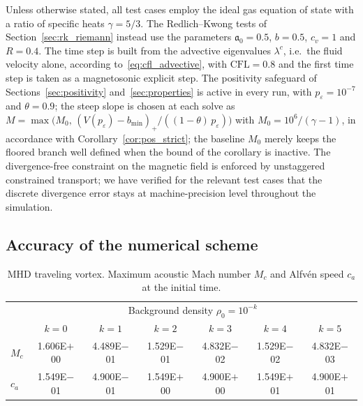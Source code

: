 \documentclass[a4paper,fleqn]{cas-sc}
\theoremstyle{definition}
\theoremstyle{remark}
\begin{document}
Unless otherwise stated, all test cases employ the ideal gas equation of state
with a ratio of specific heats $\gamma = 5/3$. The Redlich--Kwong tests of
Section~\ref{sec:rk_riemann} instead use the parameters $\mathfrak{a}_0 = 0.5$,
$b = 0.5$, $c_v = 1$ and $R = 0.4$. The time step
is built from the advective eigenvalues $\lambda^{c}$, i.e.\ the fluid velocity
alone, according to~\eqref{eq:cfl_advective}, with
$\mathrm{CFL} = 0.8$ and the first time step is taken as a magnetosonic explicit step. The positivity safeguard of Sections~\ref{sec:positivity}
and~\ref{sec:properties} is active in every run, with
$p_{\varepsilon}=10^{-7}$ and $\theta=0.9$; the steep slope is chosen at each
solve as
$M=\max\!\bigl(M_{0},\,(V(p_{\varepsilon})-b_{\min})_{+}/((1-\theta)\,
p_{\varepsilon})\bigr)$ with $M_{0}=10^{6}/(\gamma-1)$, in accordance with
Corollary~\ref{cor:pos_strict}; the baseline $M_{0}$ merely keeps the floored branch
well defined when the bound of the corollary is inactive. The
divergence-free constraint on the magnetic field is enforced by unstaggered constrained
transport; we have verified for the relevant test cases that the discrete
divergence error stays at machine-precision level throughout the simulation.
\label{sec:results}

\subsection{Accuracy of the numerical scheme}
\label{sec:convergence}

\begin{table}[t]
\centering
\caption{MHD traveling vortex. Maximum acoustic Mach number $M_c$ and Alfv\'en
speed $c_a$ at the initial time.}
\label{tab:vortex_mach}
\begin{tabular}{l cccccc}
\toprule
 & \multicolumn{6}{c}{Background density $\rho_0 = 10^{-k}$} \\
 & $k=0$ & $k=1$ & $k=2$ & $k=3$ & $k=4$ & $k=5$ \\
\midrule
$M_c$ & 1.606E$+$00 & 4.489E$-$01 & 1.529E$-$01 & 4.832E$-$02 & 1.529E$-$02 & 4.832E$-$03 \\
$c_a$   & 1.549E$-$01 & 4.900E$-$01 & 1.549E$+$00 & 4.900E$+$00 & 1.549E$+$01 & 4.900E$+$01 \\
\bottomrule
\end{tabular}
\end{table}
\end{document}
